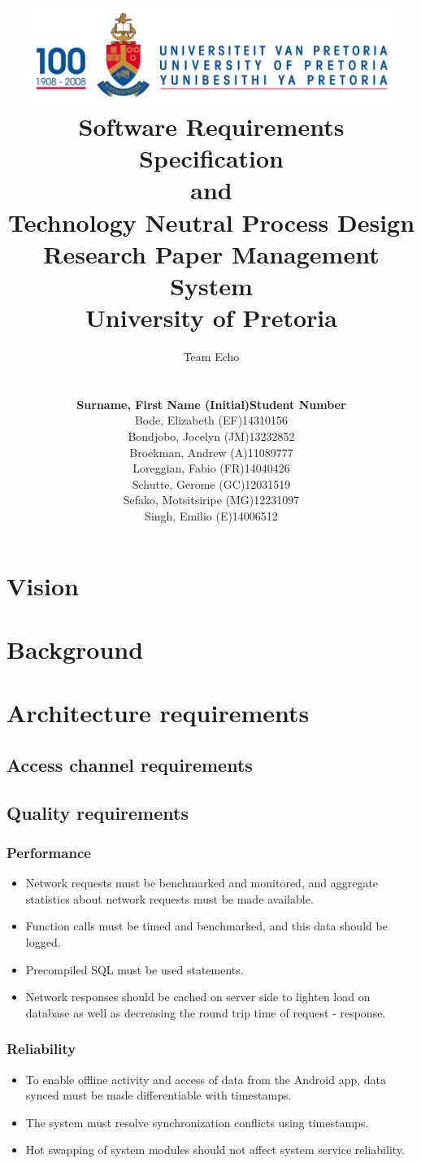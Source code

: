 \documentclass[a4paper,10pt]{article}
\title{\includegraphics[width=12cm]{Eeufeeslogo.jpg} \\
       Software Requirements Specification \\ 
       and \\
       Technology Neutral Process Design \\
       Research Paper Management System \\
       \vspace{0.5cm}
       University of Pretoria \\
       \vspace{1.0cm}
       }
\date{}
\author{Team Echo\\
	\vspace{0.5cm} \\
	\begin{tabu} to \textwidth { X[l] X[l]}
		\hline
		\textbf{Surname, First Name (Initial)}	& \textbf{Student Number}	\\ \hline \hline
		Bode, Elizabeth (EF)			& 14310156		\\ \hline
		Bondjobo, Jocelyn (JM)		& 13232852		\\ \hline
		Broekman, Andrew (A)		& 11089777		\\ \hline
		Loreggian, Fabio (FR)			& 14040426		\\ \hline
		Schutte, Gerome (GC)		& 12031519		\\ \hline
		Sefako, Motsitsiripe (MG)		& 12231097		\\ \hline
		Singh, Emilio (E)			& 14006512		\\ \hline
		\hline
	\end{tabu}}
\begin{document}
\clearpage
\maketitle
\thispagestyle{empty}

\newpage
{}

\tableofcontents

\newpage
{}

\section{Vision}

\section{Background}

\section{Architecture requirements}
\subsection{Access channel requirements}

\subsection{Quality requirements}
\subsubsection{Performance}
\begin{itemize}
\item Network requests must be benchmarked and monitored, and aggregate statistics about network requests must be made available.
\item Function calls must be timed and benchmarked, and this data should be logged.
\item Precompiled SQL must be used statements.
\item Network responses should be cached on server side to lighten load on database as well as decreasing the round trip time of request - response.
\end{itemize}

\subsubsection{Reliability}
\begin{itemize}
\item To enable offline activity and access of data from the Android app, data synced must be made differentiable with timestamps.
\item The system must resolve synchronization conflicts using timestamps.
\item Hot swapping of system modules should not affect system service reliability.
\end{itemize}
\end{document}
